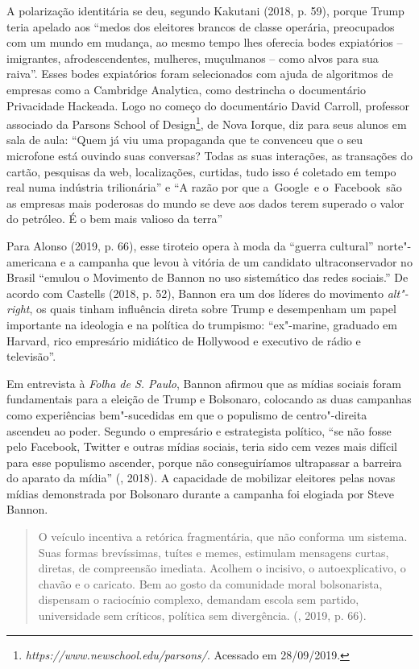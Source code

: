 A polarização identitária se deu, segundo Kakutani (2018, p. 59), porque
Trump teria apelado aos ``medos dos eleitores brancos de classe
operária, preocupados com um mundo em mudança, ao mesmo tempo lhes
oferecia bodes expiatórios -- imigrantes, afrodescendentes, mulheres,
muçulmanos -- como alvos para sua raiva''. Esses bodes expiatórios foram
selecionados com ajuda de algoritmos de empresas como a Cambridge
Analytica, como destrincha o documentário Privacidade Hackeada. Logo no
começo do documentário David Carroll, professor associado da Parsons
School of Design\footnote{\emph{https://www.newschool.edu/parsons/}.
  Acessado em 28/09/2019.}, de Nova Iorque, diz para seus alunos em sala
de aula: ``Quem já viu uma propaganda que te convenceu que o seu
microfone está ouvindo suas conversas? Todas as suas interações, as
transações do cartão, pesquisas da web, localizações, curtidas, tudo
isso é coletado em tempo real numa indústria trilionária'' e ``A razão por
que a~Google~e o~Facebook~são as empresas mais poderosas do mundo se
deve aos dados terem superado o valor do petróleo. É o bem mais valioso
da terra''

Para Alonso (2019, p. 66), esse tiroteio opera à moda da ``guerra
cultural'' norte"-americana e a campanha que levou à vitória de um
candidato ultraconservador no Brasil ``emulou o Movimento de Bannon no
uso sistemático das redes sociais.'' De acordo com Castells (2018, p.
52), Bannon era um dos líderes do movimento \emph{alt"-right}, os quais
tinham influência direta sobre Trump e desempenham um papel importante
na ideologia e na política do trumpismo: ``ex"-marine, graduado em
Harvard, rico empresário midiático de Hollywood e executivo de rádio e
televisão''.

Em entrevista à \emph{Folha de S. Paulo}, Bannon afirmou que as mídias
sociais foram fundamentais para a eleição de Trump e Bolsonaro,
colocando as duas campanhas como experiências bem"-sucedidas em que o
populismo de centro"-direita ascendeu ao poder. Segundo o empresário e
estrategista político, ``se não fosse pelo Facebook, Twitter e outras
mídias sociais, teria sido cem vezes mais difícil para esse populismo
ascender, porque não conseguiríamos ultrapassar a barreira do aparato da
mídia'' (, 2018). A capacidade de mobilizar eleitores pelas novas
mídias demonstrada por Bolsonaro durante a campanha foi elogiada por
Steve Bannon.

\begin{quote}
O veículo incentiva a retórica fragmentária, que não conforma um
sistema. Suas formas brevíssimas, tuítes e memes, estimulam mensagens
curtas, diretas, de compreensão imediata. Acolhem o incisivo, o
autoexplicativo, o chavão e o caricato. Bem ao gosto da comunidade moral
bolsonarista, dispensam o raciocínio complexo, demandam escola sem
partido, universidade sem críticos, política sem divergência. (,
2019, p. 66).
\end{quote}

